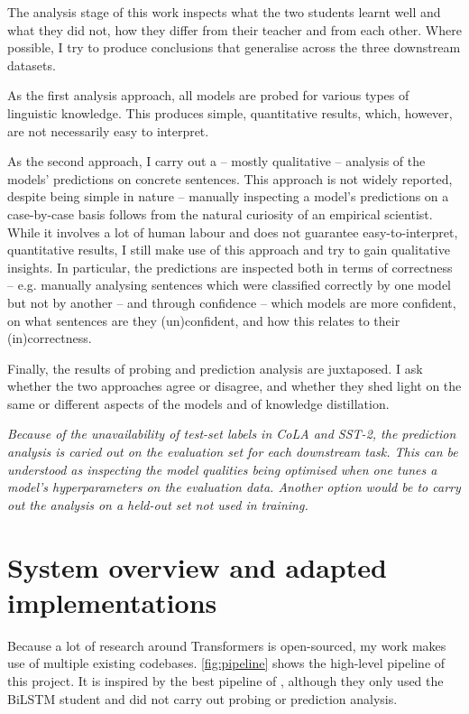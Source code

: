 \documentclass[bsc,frontabs,singlespacing,parskip,deptreport]{infthesis}
\begin{document}
{{    %
    The analysis stage of this work inspects what the two students learnt well and what they did not, how they differ from their teacher and from each other. 
    Where possible, I try to produce conclusions that generalise across the three downstream datasets.

    As the first analysis approach, all models are probed for various types of linguistic knowledge. This produces simple, quantitative results, which, however, are not necessarily easy to interpret.

    As the second approach, I carry out a -- mostly qualitative -- analysis of the models' predictions on concrete sentences. 
    This approach is not widely reported, despite being simple in nature -- manually inspecting a model's predictions on a case-by-case basis follows from the natural curiosity of an empirical scientist.
    While it involves a lot of human labour and does not guarantee easy-to-interpret, quantitative results, I still make use of this approach and try to gain qualitative insights.
    In particular, the predictions are inspected both in terms of correctness -- e.g. manually analysing sentences which were classified correctly by one model but not by another -- and through confidence -- which models are more confident, on what sentences are they (un)confident, and how this relates to their (in)correctness.

    Finally, the results of probing and prediction analysis are juxtaposed. I ask whether the two approaches agree or disagree, and whether they shed light on the same or different aspects of the models and of knowledge distillation.

    \textit{Because of the unavailability of test-set labels in CoLA and SST-2, the prediction analysis is caried out on the evaluation set for each downstream task. This can be understood as inspecting the model qualities being optimised when one tunes a model's hyperparameters on the evaluation data. Another option would be to carry out the analysis on a held-out set not used in training.}
  }

  \section{System overview and adapted implementations}{
    Because a lot of research around Transformers is open-sourced, my work makes use of multiple existing codebases. \autoref{fig:pipeline} shows the high-level pipeline of this project. It is inspired by the best pipeline of \citet{Tang_2019b}, although they only used the BiLSTM student and did not carry out probing or prediction analysis.
  
}}
\end{document}
